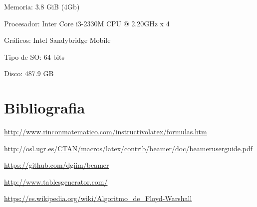\documentclass[11pt,spanish]{article} %
\begin{document}
Memoria: 3.8 GiB (4Gb)

Procesador: Inter Core i3-2330M CPU @ 2.20GHz x 4

Gráficos: Intel Sandybridge Mobile

Tipo de SO: 64 bits

Disco: 487.9 GB

\newpage

\section{Bibliografia}
\url{http://www.rinconmatematico.com/instructivolatex/formulas.htm}

\url{http://osl.ugr.es/CTAN/macros/latex/contrib/beamer/doc/beameruserguide.pdf}

\url{https://github.com/dgiim/beamer}

\url{http://www.tablesgenerator.com/}

\url{https://es.wikipedia.org/wiki/Algoritmo_de_Floyd-Warshall}
\end{document}
